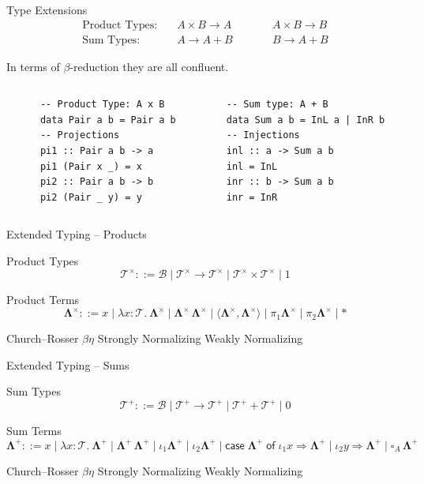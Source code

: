 \documentclass[aspectratio=169]{beamer}
\newcommand{\checkedbox}{\fbox{\ding{51}}}
\newcommand{\crossedbox}{\fbox{\ding{55}}}
\newcommand{\La}{\mathbf{\Lambda}}
\newcommand{\Bset}{\mathcal{B}}
\newcommand{\Tset}{\mathcal{T}}
\begin{document}
\begin{frame}[fragile]{Type Extensions}
  \[
    \begin{aligned}
      \text{Product Types:} \quad & A \times B \to A &\qquad& A \times B \to B \\
      \text{Sum Types:}     \quad & A \to A + B &\qquad& B \to A + B
    \end{aligned}
  \]

  In terms of $\beta$-reduction they are all confluent.

  \begin{columns}[t]
    \begin{verbatim}
      -- Product Type: A x B
      data Pair a b = Pair a b
      -- Projections
      pi1 :: Pair a b -> a
      pi1 (Pair x _) = x
      pi2 :: Pair a b -> b
      pi2 (Pair _ y) = y
    \end{verbatim}
    \begin{verbatim}
      -- Sum type: A + B
      data Sum a b = InL a | InR b
      -- Injections
      inl :: a -> Sum a b
      inl = InL
      inr :: b -> Sum a b
      inr = InR
    \end{verbatim}
  \end{columns}
\end{frame}


\begin{frame}{Extended Typing -- Products}
  \begin{block}{Product Types}
    \[
      \Tset^\times ::= \Bset \mid \Tset^\times \to \Tset^\times \mid \Tset^\times \times \Tset^\times \mid 1
    \]
  \end{block}
  \begin{block}{Product Terms}
    \[
      \La^\times ::= x \mid \lambda x : \Tset.\ \La^\times \mid \La^\times \, \La^\times \mid \langle \La^\times, \La^\times \rangle \mid \pi_1 \La^\times \mid \pi_2 \La^\times \mid *
    \]
  \end{block}
  \hfill Church--Rosser $\beta\eta$ \crossedbox \hfill Strongly Normalizing \checkedbox \hfill Weakly Normalizing \checkedbox \hfill
\end{frame}

\begin{frame}{Extended Typing -- Sums}
  \begin{block}{Sum Types}
    \[
      \Tset^+ ::= \Bset \mid \Tset^+ \to \Tset^+ \mid \Tset^+ + \Tset^+ \mid 0
    \]
  \end{block}
  \begin{block}{Sum Terms}
    \[
      \La^+ ::= x 
      \mid \lambda x : \Tset.\ \La^+ 
      \mid \La^+\,\La^+ 
      \mid \iota_1 \La^+ 
      \mid \iota_2 \La^+ 
      \mid \mathsf{case}\; \La^+\; \mathsf{of}\;\iota_1 x \Rightarrow \La^+ \mid \iota_2 y \Rightarrow \La^+
      \mid \square_A\,\La^+
    \]
  \end{block}
  \hfill Church--Rosser $\beta\eta$ \crossedbox \hfill Strongly Normalizing \checkedbox \hfill Weakly Normalizing \checkedbox \hfill
\end{frame}
\end{document}
